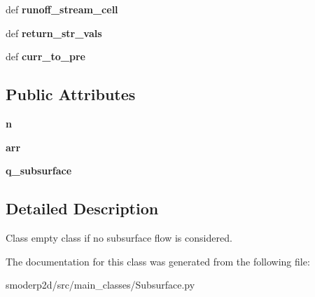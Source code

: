 \begin{DoxyCompactItemize}
\item 
\hypertarget{classsmoderp2d_1_1src_1_1main__classes_1_1Subsurface_1_1SubsurfacePass_a154be8d42dd279cf533545c7128697f0}{def {\bfseries runoff\-\_\-stream\-\_\-cell}}\label{classsmoderp2d_1_1src_1_1main__classes_1_1Subsurface_1_1SubsurfacePass_a154be8d42dd279cf533545c7128697f0}

\item 
\hypertarget{classsmoderp2d_1_1src_1_1main__classes_1_1Subsurface_1_1SubsurfacePass_aa803af6a9d76025033b00c980bf36961}{def {\bfseries return\-\_\-str\-\_\-vals}}\label{classsmoderp2d_1_1src_1_1main__classes_1_1Subsurface_1_1SubsurfacePass_aa803af6a9d76025033b00c980bf36961}

\item 
\hypertarget{classsmoderp2d_1_1src_1_1main__classes_1_1Subsurface_1_1SubsurfacePass_a061840e5785c980cde76b41a208792f9}{def {\bfseries curr\-\_\-to\-\_\-pre}}\label{classsmoderp2d_1_1src_1_1main__classes_1_1Subsurface_1_1SubsurfacePass_a061840e5785c980cde76b41a208792f9}

\end{DoxyCompactItemize}
\subsection*{Public Attributes}
\begin{DoxyCompactItemize}
\item 
\hypertarget{classsmoderp2d_1_1src_1_1main__classes_1_1Subsurface_1_1SubsurfacePass_a4e23f0e451462cff2809755e9fb5a9be}{{\bfseries n}}\label{classsmoderp2d_1_1src_1_1main__classes_1_1Subsurface_1_1SubsurfacePass_a4e23f0e451462cff2809755e9fb5a9be}

\item 
\hypertarget{classsmoderp2d_1_1src_1_1main__classes_1_1Subsurface_1_1SubsurfacePass_a821e396c68937e815cbc43b2bd14aaa9}{{\bfseries arr}}\label{classsmoderp2d_1_1src_1_1main__classes_1_1Subsurface_1_1SubsurfacePass_a821e396c68937e815cbc43b2bd14aaa9}

\item 
\hypertarget{classsmoderp2d_1_1src_1_1main__classes_1_1Subsurface_1_1SubsurfacePass_a014d041b86aea9a92b5d1bb46003234f}{{\bfseries q\-\_\-subsurface}}\label{classsmoderp2d_1_1src_1_1main__classes_1_1Subsurface_1_1SubsurfacePass_a014d041b86aea9a92b5d1bb46003234f}

\end{DoxyCompactItemize}


\subsection{Detailed Description}
Class empty class if no subsurface flow is considered. 

The documentation for this class was generated from the following file\-:\begin{DoxyCompactItemize}
\item 
smoderp2d/src/main\-\_\-classes/Subsurface.\-py\end{DoxyCompactItemize}
